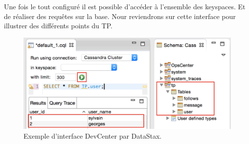 \par Une fois le tout configuré il est possible d'accéder à l'ensemble des keyspaces. Et de réaliser des requêtes sur la base.
Nour reviendrons sur cette interface pour illustrer des différents points du TP.
\begin{figure}[h!]
\centering
\includegraphics[scale=0.5]{img/select.png}
\caption{Exemple d'interface DevCenter par DataStax.}
\end{figure}
